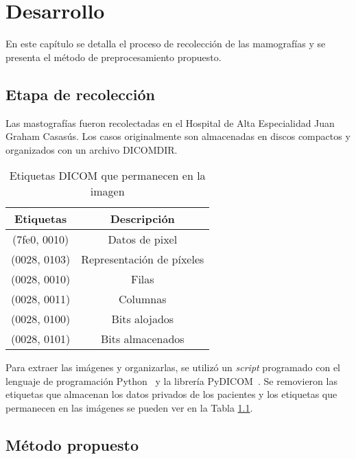 \chapter{Desarrollo}
\label{desarrollo}

En este capítulo se detalla el proceso de recolección de las mamografías y se
presenta el método de preprocesamiento propuesto.

\section{Etapa de recolección}

Las mastografías fueron recolectadas en el Hospital de Alta Especialidad Juan
Graham Casasús. Los casos originalmente son almacenadas en discos compactos y
organizados con un archivo DICOMDIR. 

\begin{table}[h]
  \caption[Etiquetas DICOM]{Etiquetas DICOM que permanecen en la imagen} 
  \label{table:dicomtags}
\begin{center}
{\scriptsize
    \begin{tabular}{c|c}
    \hline

    {\bf Etiquetas} & 
    {\bf Descripción} \\
    \hline
        (7fe0, 0010) & Datos de pixel\\
        (0028, 0103) & Representación de píxeles \\
        (0028, 0010) & Filas \\
        (0028, 0011) & Columnas \\
        (0028, 0100) & Bits alojados \\
        (0028, 0101) & Bits almacenados \\
    \hline
    \end{tabular}
}
\end{center}
\end{table}

Para extraer las imágenes y organizarlas, se utilizó un \textit{script}
programado con el lenguaje de programación Python~\cite{python} y la librería
PyDICOM~\cite{pydicom}. Se removieron las etiquetas que almacenan los datos
privados de los pacientes y los etiquetas que permanecen en las imágenes se
pueden ver en la Tabla \ref{table:dicomtags}.

\section{Método propuesto}


